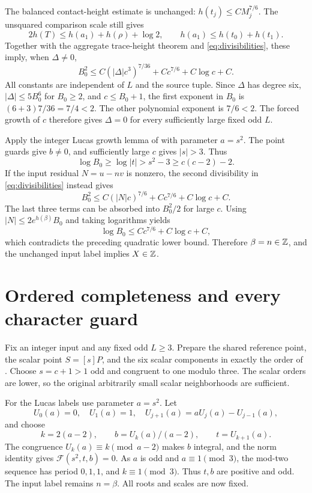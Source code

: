 \documentclass[11pt,a4paper]{article}
\begin{document}
The balanced contact-height estimate is unchanged:
\(h(t_j)\le C M_j^{7/6}\). The unsquared comparison scale still gives
\[
 2h(T)\le h(a_1)+h(\rho)+\log2,
 \qquad h(a_1)\le h(t_0)+h(t_1).
\]
Together with the aggregate trace-height theorem and
\eqref{eq:divisibilities}, these imply, when \(\Delta\ne0\),
\[
 B_0^2\le C(|\Delta|c^3)^{7/36}
               +Cc^{7/6}+C\log c+C.
\]
All constants are independent of \(L\) and the source tuple.
Since \(\Delta\) has degree six, \(|\Delta|\le5B_0^6\) for
\(B_0\ge2\), and \(c\le B_0+1\), the first exponent in \(B_0\)
is \((6+3)7/36=7/4<2\). The other polynomial exponent is
\(7/6<2\). The forced growth of \(c\) therefore gives
\(\Delta=0\) for every sufficiently large fixed odd \(L\).

Apply the integer Lucas growth lemma of \cite{Baseline} with parameter
\(a=s^2\). The point guards give \(b\ne0\), and sufficiently
large \(c\) gives \(|s|>3\). Thus
\[
 \log B_0\ge\log|t|>s^2-3
              \ge c(c-2)-2.
\]
If the input residual \(N=u-nv\) is nonzero, the second divisibility
in \eqref{eq:divisibilities} instead gives
\[
 B_0^2\le C(|N|c)^{7/6}+Cc^{7/6}+C\log c+C.
\]
The last three terms can be absorbed into \(B_0^2/2\) for large
\(c\). Using \(|N|\le2e^{h(\beta)}B_0\) and taking logarithms yields
\[
 \log B_0\le Cc^{7/6}+C\log c+C,
\]
which contradicts the preceding quadratic lower bound.
Therefore \(\beta=n\in\mathbb Z\), and the unchanged input label implies
\(X\in\mathbb Z\).

\section{Ordered completeness and every character guard}

Fix an integer input and any fixed odd \(L\ge3\).
Prepare the shared reference point, the scalar point \(S=[s]P\),
and the six scalar components in exactly the order of
\cite{General,Reweighted}. Choose \(s=c+1>1\) odd and congruent to
one modulo three. The scalar orders are lower, so the original
arbitrarily small scalar neighborhoods are sufficient.

For the Lucas labels use parameter \(a=s^2\). Let
\[
 U_0(a)=0,\quad U_1(a)=1,\quad
 U_{j+1}(a)=aU_j(a)-U_{j-1}(a),
\]
and choose
\[
 k=2(a-2),\qquad b=U_k(a)/(a-2),\qquad t=U_{k+1}(a).
\]
The congruence \(U_k(a)\equiv k\pmod{a-2}\) makes \(b\) integral,
and the norm identity gives \(\mathcal F(s^2,t,b)=0\).
As \(a\) is odd and \(a\equiv1\pmod3\), the mod-two sequence has
period \(0,1,1\), and \(k\equiv1\pmod3\). Thus \(t,b\) are positive
and odd. The input label remains \(n=\beta\). All roots and scales
are now fixed.
\end{document}
